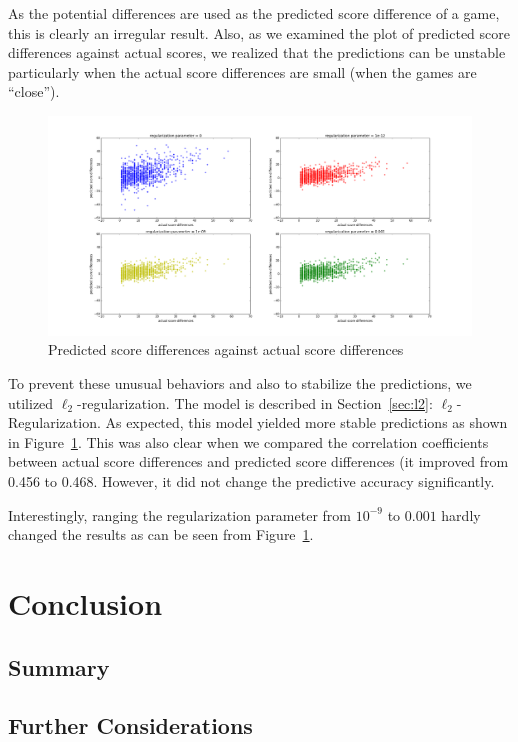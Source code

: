 \documentclass{article} %
\begin{document}
As the potential differences are used as the predicted score difference of a game, this is clearly an irregular result.  Also, as we examined the plot of predicted score differences against actual scores, we realized that the predictions can be unstable particularly when the actual score differences are small (when the games are ``close''). 

\begin{figure}[ht!]
    \centering
    \includegraphics[width=140mm]{actual_vs_predict.png}
    \caption{Predicted score differences against actual score differences}
    \label{actual_vs_predict}
\end{figure}

To prevent these unusual behaviors and also to stabilize the predictions, we utilized $\ell_2$-regularization.  The model is described in Section~\ref{sec:l2}: $\ell_2$-Regularization.  As expected, this model yielded more stable predictions as shown in Figure~\ref{actual_vs_predict}.  This was also clear when we compared the correlation coefficients between actual score differences and predicted score differences (it improved from 0.456 to 0.468.  However, it did not change the predictive accuracy significantly.

Interestingly, ranging the regularization parameter from $10^{-9}$ to $0.001$ hardly changed the results as can be seen from Figure~\ref{actual_vs_predict}.


\section{Conclusion}
\subsection{Summary}
\subsection{Further Considerations}






\end{document}
